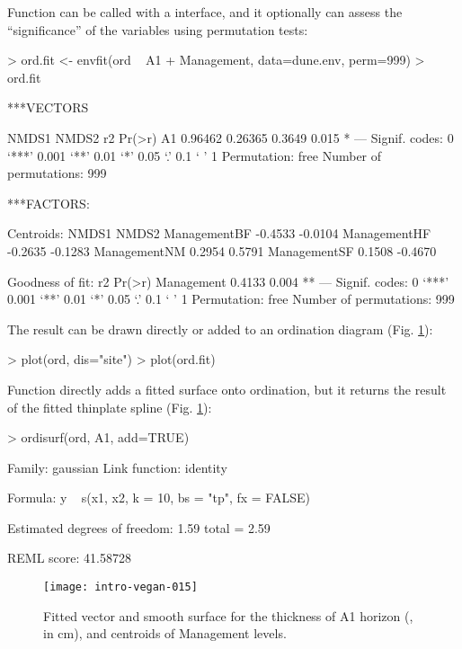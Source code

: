 \documentclass[a4paper,10pt]{article}
\begin{document}
Function  can be called with a 
interface, and it optionally can assess the ``significance'' of the
variables using permutation tests:
\begin{Schunk}
\begin{Sinput}
> ord.fit <- envfit(ord ~ A1 + Management, data=dune.env, perm=999)
> ord.fit
\end{Sinput}
\begin{Soutput}
***VECTORS

     NMDS1   NMDS2     r2 Pr(>r)  
A1 0.96462 0.26365 0.3649  0.015 *
---
Signif. codes:  0 ‘***’ 0.001 ‘**’ 0.01 ‘*’ 0.05 ‘.’ 0.1 ‘ ’ 1
Permutation: free
Number of permutations: 999

***FACTORS:

Centroids:
               NMDS1   NMDS2
ManagementBF -0.4533 -0.0104
ManagementHF -0.2635 -0.1283
ManagementNM  0.2954  0.5791
ManagementSF  0.1508 -0.4670

Goodness of fit:
               r2 Pr(>r)   
Management 0.4133  0.004 **
---
Signif. codes:  0 ‘***’ 0.001 ‘**’ 0.01 ‘*’ 0.05 ‘.’ 0.1 ‘ ’ 1
Permutation: free
Number of permutations: 999
\end{Soutput}
\end{Schunk}
The result can be drawn directly or added to an ordination diagram
(Fig. \ref{fig:envfit}):
\begin{Schunk}
\begin{Sinput}
> plot(ord, dis="site")
> plot(ord.fit)
\end{Sinput}
\end{Schunk}

Function  directly adds a fitted surface onto
ordination, but it returns the result of the fitted thinplate spline
 (Fig. \ref{fig:envfit}):
\begin{Schunk}
\begin{Sinput}
> ordisurf(ord, A1, add=TRUE)
\end{Sinput}
\begin{Soutput}
Family: gaussian 
Link function: identity 

Formula:
y ~ s(x1, x2, k = 10, bs = "tp", fx = FALSE)

Estimated degrees of freedom:
1.59  total = 2.59 

REML score: 41.58728     
\end{Soutput}
\end{Schunk}
\begin{figure}
\texttt{[image: intro-vegan-015]}
\caption{Fitted vector and smooth surface for the thickness of A1
  horizon (, in cm), and centroids of Management levels.}
\label{fig:envfit}
\end{figure}
\end{document}
